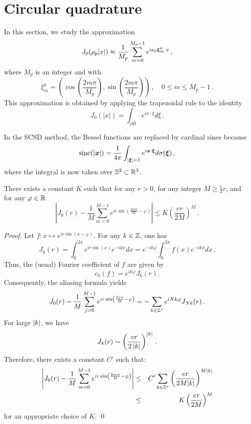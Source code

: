 \documentclass[smallextended]{svjour3}
\begin{document}
\section{Circular quadrature}
\label{sec:circular}
In this section, we study the approximation
\[ J_0(\rho_p|x|) \approx \dfrac{1}{M_p}\sum_{m=0}^{M_p-1}e^{i \rho_p \boldsymbol{\xi}^p_m \cdot x}\,, \]
where $M_p$ is an integer and with
\begin{equation}
	\label{defXimp}
	\xi_m^p = \left(\cos\left(\frac{2 m \pi}{M_p}\right),\sin\left(\frac{2 m\pi }{M_p}\right)\right)\,, \quad 0 \leq m \leq M_p - 1\,.
\end{equation} 
This approximation is obtained by applying the trapezoidal rule to the identity 
\[ J_0(|x|) = \int_{\partial B} e^{i x \cdot \xi} d\xi\,.\]
\begin{remark}
	In the SCSD method, the Bessel functions are replaced by cardinal sines because
	\[ \textup{sinc}(\left\lvert \boldsymbol{x} \right\rvert) =  \frac{1}{4\pi}\int_{\left\lvert \boldsymbol{\xi} \right\rvert=1} e^{i \boldsymbol{x}\cdot \boldsymbol{\xi}} d\sigma(\boldsymbol{\xi}) \,, \]
	where the integral is now taken over $\mathbb {S}^2 \subset \mathbb{R}^3$. 
\end{remark}
\begin{theorem} There exists a constant $K$ such that for any $r>0$, for any integer $M \geq \frac{e}{2}r$, and for any $\varphi \in \mathbb{R}$ 
	\[\left|J_0(r) -  \dfrac{1}{M}\sum_{m=0}^{M-1}e^{ir\sin\left(\frac{2m\pi}{M}-\varphi\right)} \right| \leq K \left(\dfrac{er}{2M}\right)^M\,.\]
	\label{QuadratureCirc}
\end{theorem}
\begin{proof}
	Let $f : x \mapsto e^{ir\sin(x - \varphi)}$. For any $k \in \mathbb{Z}$, one has
	\[J_k(r) =  \int_{0}^{2\pi}e^{ir\sin(x)}e^{-ikx}dx =  e^{-ik\varphi}\int_{0}^{2\pi}f(x)e^{-ikx}dx\,.\] 
	Thus, the (usual) Fourier coefficient of $f$ are given by 
	\[c_k(f) = e^{ik\varphi}J_k(r).\]
	Consequently, the aliasing formula yields 
	\[J_0(r) -  \dfrac{1}{M} \sum_{j=0}^{M-1} e^{ir \sin \left( \frac{2j\pi}{M}-\varphi \right)} = -\sum_{k\in \mathbb{Z}^*}e^{iNk\varphi}J_{Nk}(r)\,.\] 
	For large $\left\lvert k \right\rvert$, we have
	\[J_k(r) \sim \left(\dfrac{er}{2\left\lvert k \right\rvert}\right)^{\left\lvert k \right\rvert}\,.\]
	Therefore, there exists a constant $C'$ such that: 
\begin{eqnarray*}
	\left\lvert J_0(r) -  \dfrac{1}{M}\sum_{m=0}^{M-1}e^{ir\sin\left(\frac{2m\pi}{M}-\varphi\right)} \right\rvert &\leq& C' \sum_{k\in \mathbb{Z}^*} \left(\dfrac{er}{2M|k|}\right)^{M|k|}\\
		&\leq& K \left(\dfrac{er}{2M}\right)^M 
\end{eqnarray*}
for an appropriate choice of $K$.	
\qed
\end{proof}
\end{document}
